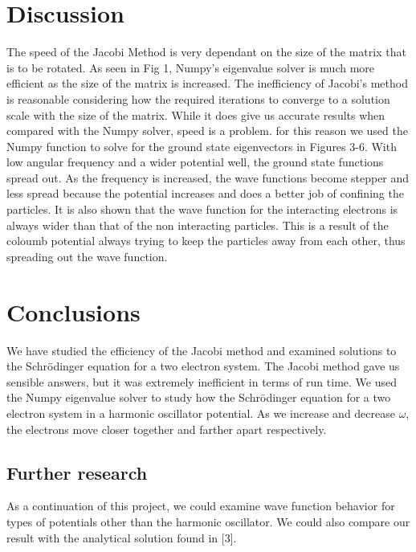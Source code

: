 \documentclass{emulateapj}
\begin{document}
\section{Discussion}
\label{sec:discussion}
The speed of the Jacobi Method is very dependant on the size of the matrix that is to be rotated. As seen in Fig 1, Numpy's eigenvalue solver is much more efficient as the size of the matrix is increased. The inefficiency of Jacobi's method is reasonable considering how the required iterations to converge to a solution scale with the size of the matrix. While it does give us accurate results when compared with the Numpy solver, speed is a problem. for this reason we used the Numpy function to solve for the ground state eigenvectors in Figures 3-6. With low angular frequency and a wider potential well, the ground state functions spread out. As the frequency is increased, the wave functions become stepper and less spread because the potential increases and does a better job of confining the particles. It is also shown that the wave function for the interacting electrons is always wider than that of the non interacting particles. This is a result of the coloumb potential always trying to keep the particles away from each other, thus spreading out the wave function.

\section{Conclusions}
\label{sec:conclusions}
We have studied the efficiency of the Jacobi method and examined solutions to the Schrödinger equation for a two electron system. The Jacobi method gave us sensible answers, but it was extremely inefficient in terms of run time. We used the Numpy eigenvalue solver to study how the Schrödinger equation for a two electron system in a harmonic oscillator potential. As we increase and decrease $\omega$, the electrons move closer together and farther apart respectively.


\subsection{Further research}
As a continuation of this project, we could examine wave function behavior for types of potentials other than the harmonic oscillator. We could also compare our result with the analytical solution found in [3].
\end{document}
